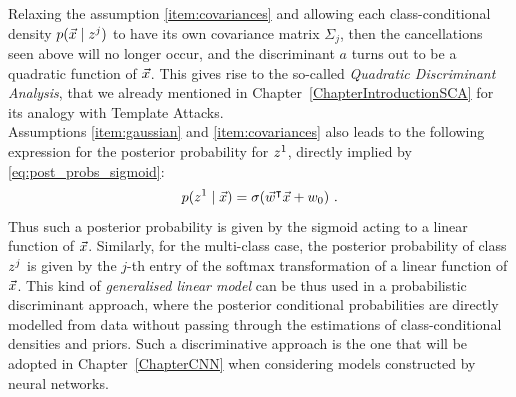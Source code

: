 Relaxing the assumption \ref{item:covariances} and allowing each class-conditional density $p(\vec{x}\mid z^j)$ to have its own covariance matrix $\Sigma_j$, then the cancellations seen above will no longer occur, and the discriminant $a$ turns out to be a quadratic function of $\vec{x}$. This gives rise to the so-called \emph{Quadratic Discriminant Analysis}, that we already mentioned in Chapter~\ref{ChapterIntroductionSCA} for its analogy with Template Attacks.\\

Assumptions \ref{item:gaussian} and \ref{item:covariances} also leads to the following expression for the posterior probability for $z^1$, directly implied by \eqref{eq:post_probs_sigmoid}: 
\begin{equation}
p(z^1\mid \vec{x}) = \sigma(\vec{w}^\intercal \vec{x} + w_0)\mbox{ .}
\end{equation}
Thus such a posterior probability is given by the sigmoid acting to a linear function of $\vec{x}$. Similarly, for the multi-class case, the posterior probability of class $z^j$ is given by the $j$-th entry of the softmax transformation of a linear function of $\vec{x}$. This kind of \emph{generalised linear model} can be thus used in a probabilistic discriminant approach, where the posterior conditional probabilities are directly modelled from data without passing through the estimations of class-conditional densities and priors. Such a discriminative approach is the one that will be adopted in Chapter~\ref{ChapterCNN} when considering models constructed by neural networks.






